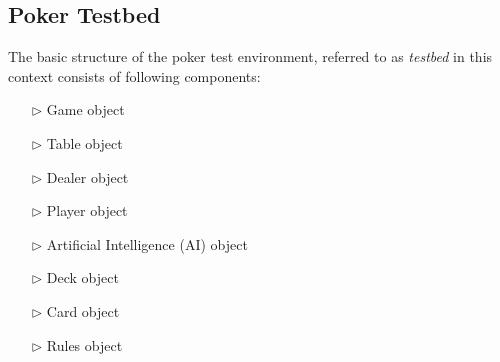 \subsection{Poker Testbed}
The basic structure of the poker test environment, referred to as \textit{testbed} in this context consists of following components:\\
\pagebreak
\begin{multicols}{2}
\begin{itemize}
\item[$\triangleright$] Game object
\item[$\triangleright$] Table object
\item[$\triangleright$] Dealer object
\item[$\triangleright$] Player object
\end{itemize}
\columnbreak
\begin{itemize}
\item[$\triangleright$] Artificial Intelligence (AI) object
\item[$\triangleright$] Deck object
\item[$\triangleright$] Card object
\item[$\triangleright$] Rules object
\end{itemize}
\end{multicols}

